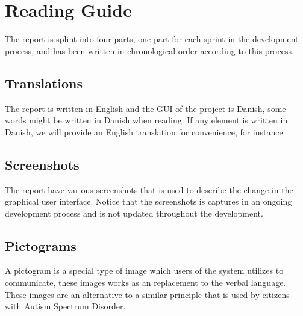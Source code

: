 
\section*{Reading Guide}
The report is splint into four parts, one part for each sprint in the development process\parencite{scrum}, and has been written in chronological order according to this process. 

\subsection*{Translations}
\label{sub:translations}
The report is written in English and the GUI of the project is Danish, some words might be written in Danish when reading. If any element is written in Danish, we will provide an English translation for convenience, for instance .

\subsection*{Screenshots}
The report have various screenshots that is used to describe the change in the graphical user interface. Notice that the screenshots is captures in an ongoing development process and is not updated throughout the development.

\subsection*{Pictograms}
A pictogram is a special type of image which users of the \giraf system utilizes to communicate, these images works as an replacement to the verbal language. These images are an alternative to a similar principle that is used by citizens with Autism Spectrum Disorder.  
